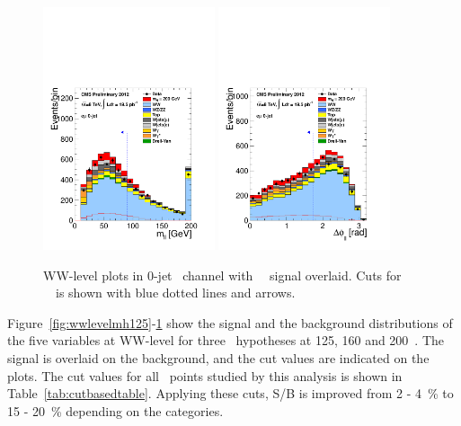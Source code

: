 \begin{figure}[htp]
\includegraphics[width=0.45\textwidth]{figures/hww_analysis16_200_ALL_of_0j_mll.pdf}
\includegraphics[width=0.45\textwidth]{figures/hww_analysis16_200_ALL_of_0j_dphi.pdf}
\caption{ WW-level plots in 0-jet \DF\ channel with ~\GeV\ signal overlaid. 
Cuts for ~\GeV\ is shown with blue dotted lines and arrows. 
}
\label{fig:wwlevelmh200}
\end{figure}

Figure~\ref{fig:wwlevelmh125}-\ref{fig:wwlevelmh200} show the signal and the background 
distributions of the five variables at WW-level for three \mHi\ hypotheses 
at 125, 160 and 200~\GeV. The signal is overlaid on the background, and   
the cut values are indicated on the plots.  
The cut values for all \mHi\ points studied by this analysis is 
shown in Table~\ref{tab:cutbasedtable}.
Applying these cuts, S/B is improved from 2 - 4~\% to 15 - 20~\%
depending on the categories. 

